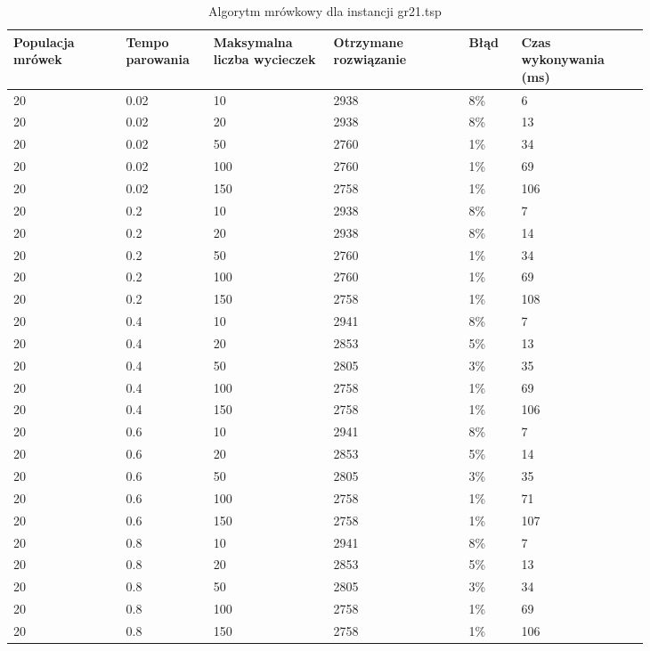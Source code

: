 \documentclass[12pt,a4paper,titlepage]{article}
\begin{document}
\begin{table}[H]
	\caption{Algorytm mrówkowy dla instancji gr21.tsp}
    \centering
	\begin{tabular}{|p{0.15\linewidth}|p{0.10\linewidth}|p{0.16\linewidth}|p{0.18\linewidth}|p{0.07\linewidth}|p{0.17\linewidth}|}
		\hline
        Populacja mrówek & Tempo parowania & Maksymalna liczba \newline wycieczek & Otrzymane rozwiązanie & Błąd & Czas \newline wykonywania (ms) \\
		\hline
        20 & 0.02 & 10 & 2938 & 8\% & 6 \\
        20 & 0.02 & 20 & 2938 & 8\% & 13 \\
        20 & 0.02 & 50 & 2760 & 1\% & 34 \\
        20 & 0.02 & 100 & 2760 & 1\% & 69 \\
        20 & 0.02 & 150 & 2758 & 1\% & 106 \\
        \hline
        20 & 0.2 & 10 & 2938 & 8\% & 7 \\
        20 & 0.2 & 20 & 2938 & 8\% & 14 \\
        20 & 0.2 & 50 & 2760 & 1\% & 34 \\
        20 & 0.2 & 100 & 2760 & 1\% & 69 \\
        20 & 0.2 & 150 & 2758 & 1\% & 108 \\
        \hline
        20 & 0.4 & 10 & 2941 & 8\% & 7 \\
        20 & 0.4 & 20 & 2853 & 5\% & 13 \\
        20 & 0.4 & 50 & 2805 & 3\% & 35 \\
        20 & 0.4 & 100 & 2758 & 1\% & 69 \\
        20 & 0.4 & 150 & 2758 & 1\% & 106 \\
        \hline
        20 & 0.6 & 10 & 2941 & 8\% & 7 \\
        20 & 0.6 & 20 & 2853 & 5\% & 14 \\
        20 & 0.6 & 50 & 2805 & 3\% & 35 \\
        20 & 0.6 & 100 & 2758 & 1\% & 71 \\
        20 & 0.6 & 150 & 2758 & 1\% & 107 \\
        \hline
        20 & 0.8 & 10 & 2941 & 8\% & 7 \\
        20 & 0.8 & 20 & 2853 & 5\% & 13 \\
        20 & 0.8 & 50 & 2805 & 3\% & 34 \\
        20 & 0.8 & 100 & 2758 & 1\% & 69 \\
        20 & 0.8 & 150 & 2758 & 1\% & 106 \\
        \hline
    \end{tabular}
\end{table}
\end{document}
